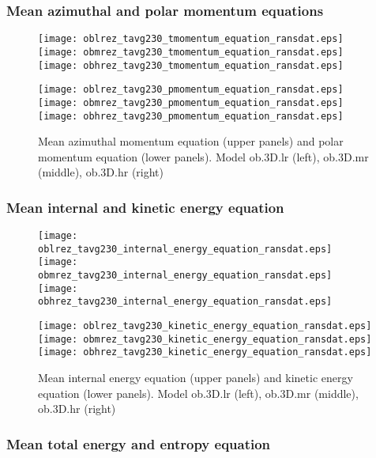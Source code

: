 \documentclass[10pt,paper=a4]{report}
\begin{document}
\newpage

\subsubsection{Mean azimuthal and polar momentum equations}

\begin{figure}[!h]
\centerline{
\texttt{[image: oblrez\_tavg230\_tmomentum\_equation\_ransdat.eps]}
\texttt{[image: obmrez\_tavg230\_tmomentum\_equation\_ransdat.eps]}
\texttt{[image: obhrez\_tavg230\_tmomentum\_equation\_ransdat.eps]}}

\centerline{
\texttt{[image: oblrez\_tavg230\_pmomentum\_equation\_ransdat.eps]}
\texttt{[image: obmrez\_tavg230\_pmomentum\_equation\_ransdat.eps]}
\texttt{[image: obhrez\_tavg230\_pmomentum\_equation\_ransdat.eps]}}
\caption{Mean azimuthal momentum equation (upper panels) and polar momentum equation (lower panels). Model {\sf ob.3D.lr} (left), {\sf ob.3D.mr} (middle), {\sf ob.3D.hr} (right) \label{fig:ob-res-tmomentum-pmomentum-equation}}
\end{figure}

\newpage

\subsubsection{Mean internal and kinetic energy equation}

\begin{figure}[!h]
\centerline{
\texttt{[image: oblrez\_tavg230\_internal\_energy\_equation\_ransdat.eps]}
\texttt{[image: obmrez\_tavg230\_internal\_energy\_equation\_ransdat.eps]}
\texttt{[image: obhrez\_tavg230\_internal\_energy\_equation\_ransdat.eps]}}

\centerline{
\texttt{[image: oblrez\_tavg230\_kinetic\_energy\_equation\_ransdat.eps]}
\texttt{[image: obmrez\_tavg230\_kinetic\_energy\_equation\_ransdat.eps]}
\texttt{[image: obhrez\_tavg230\_kinetic\_energy\_equation\_ransdat.eps]}}
\caption{Mean internal energy equation (upper panels) and kinetic energy equation (lower panels). Model {\sf ob.3D.lr} (left), {\sf ob.3D.mr} (middle), {\sf ob.3D.hr} (right) \label{fig:ob-res-ei-ek-equation}}
\end{figure}

\newpage

\subsubsection{Mean total energy and entropy equation}
\end{document}
